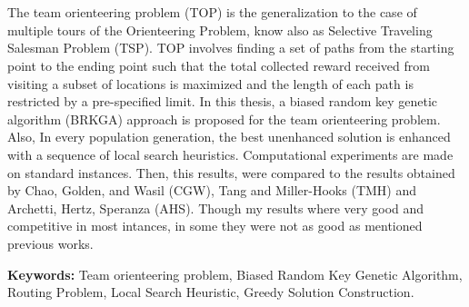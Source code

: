 
\chapter*{\tituloAbstractEn}

\noindent The team orienteering problem (TOP) is the generalization to the case of multiple tours of the Orienteering Problem, know also as Selective Traveling Salesman Problem (TSP). TOP involves finding a set of paths from the starting point to the ending point such that the total collected reward received from visiting a subset of locations is maximized and the length of each path is restricted by a pre-specified limit. In this thesis, a biased random key genetic algorithm (BRKGA) approach is proposed for the team orienteering problem. Also, In every population generation, the best unenhanced solution is enhanced with a sequence of local search heuristics. Computational experiments are made on standard instances. Then, this results, were compared to the results obtained by Chao, Golden, and Wasil (CGW), Tang and Miller-Hooks (TMH) and Archetti, Hertz, Speranza (AHS). Though my results where very good and competitive in most intances, in some they were not as good as mentioned previous works.

\bigskip

\noindent\textbf{Keywords:} Team orienteering problem, Biased Random Key Genetic Algorithm, Routing Problem, Local Search Heuristic, Greedy Solution Construction.
